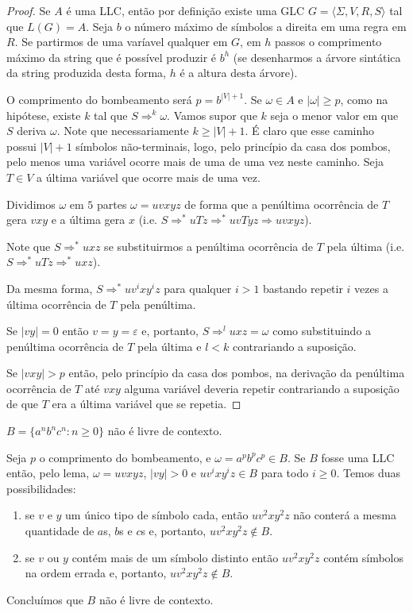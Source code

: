 \begin{proof}
  Se $A$ é uma LLC, então por definição existe uma GLC $G = \langle \Sigma, V, R, S \rangle$ tal que $L(G) = A$.
  Seja $b$ o número máximo de símbolos a direita em uma regra em $R$.
  Se partirmos de uma varíavel qualquer em $G$, em $h$ passos o comprimento máximo da string que é possível produzir é $b^h$ (se desenharmos a árvore sintática da string produzida desta forma, $h$ é a altura desta árvore).

  O comprimento do bombeamento será $p = b^{|V| + 1}$.
  Se $\omega \in A$ e $|\omega| \geq p$, como na hipótese, existe $k$ tal que $S \Rightarrow^k \omega$.
  Vamos supor que $k$ seja o menor valor em que $S$ deriva $\omega$.
  Note que necessariamente $k \geq |V| + 1$.
  É claro que esse caminho possui $|V|+1$ símbolos não-terminais, logo, pelo princípio da casa dos pombos, pelo menos uma variável ocorre mais de uma de uma vez neste caminho.
  Seja $T \in V$ a última variável que ocorre mais de uma vez.

  Dividimos $\omega$ em $5$ partes $\omega = uvxyz$ de forma que a penúltima ocorrência de $T$ gera $vxy$ e a última gera $x$ (i.e. $S \Rightarrow^* uTz \Rightarrow^* uvTyz \Rightarrow uvxyz$).


Note que $S \Rightarrow^* uxz$ se substituirmos a penúltima ocorrência de $T$ pela última (i.e. $S \Rightarrow^* uTz \Rightarrow^* uxz$).


Da mesma forma, $S \Rightarrow^* uv^ixy^iz$ para qualquer $i > 1$ bastando repetir $i$ vezes a última ocorrência de $T$ pela penúltima.


Se $|vy| = 0$ então $v = y = \varepsilon$ e, portanto, $S \Rightarrow^l uxz = \omega$ como substituindo a penúltima ocorrência de $T$ pela última e $l < k$ contrariando a suposição.

Se $|vxy| > p$ então, pelo princípio da casa dos pombos, na derivação da penúltima ocorrência de $T$ até $vxy$ alguma variável deveria repetir contrariando a suposição de que $T$ era a última variável que se repetia.
\end{proof}


\begin{example}
  $B = \{a^nb^nc^n : n \geq 0\}$ não é livre de contexto.

  Seja $p$ o comprimento do bombeamento, e $\omega = a^pb^pc^p \in B$.
  Se $B$ fosse uma LLC então, pelo lema, $\omega = uvxyz$, $|vy| > 0$ e $uv^ixy^iz \in B$ para todo $i \geq 0$.
  Temos duas possibilidades:
  \begin{enumerate}
  \item se $v$ e $y$ um único tipo de símbolo cada, então $uv^2xy^2z$ não conterá a mesma quantidade de $a$s, $b$s e $c$s e, portanto, $uv^2xy^2z \notin B$.
  \item se $v$ ou $y$ contém mais de um símbolo distinto então $uv^2xy^2z$ contém símbolos na ordem errada e, portanto, $uv^2xy^2z \notin B$.
  \end{enumerate}
  Concluímos que $B$ não é livre de contexto.
\end{example}

